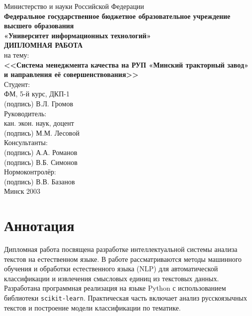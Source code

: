 \documentclass[14pt,a4paper]{extarticle}
\begin{document}
\begin{titlepage}
    \centering
    \large
    Министерство и науки Российской Федерации\\
    \textbf{Федеральное государственное бюджетное образовательное учреждение высшего образования}\\
    \textbf{«Университет информационных технологий»}\\[2cm]

    \textbf{\Large ДИПЛОМНАЯ РАБОТА}\\[0.5cm]
    на тему:\\[0.3cm]
    \textbf{<<Система менеджмента качества на РУП «Минский тракторный завод» и направления её совершенствования>>}\\[4cm]

    Студент:\\
    ФМ, 5-й курс, ДКП-1\\
    (подпись) В.Л. Громов\\[1cm]

    Руководитель:\\
    кан. экон. наук, доцент\\
    (подпись) М.М. Лесовой\\[1cm]

    Консультанты:\\
    (подпись) А.А. Романов\\
    (подпись) В.Б. Симонов\\[1cm]

    Нормоконтролёр:\\
    (подпись) В.В. Базанов\\[3cm]

    Минск 2003
\end{titlepage}

\tableofcontents
\newpage

\section*{Аннотация}
Дипломная работа посвящена разработке интеллектуальной системы анализа текстов на естественном языке.
В работе рассматриваются методы машинного обучения и обработки естественного языка (NLP) для автоматической классификации и извлечения смысловых единиц из текстовых данных.
Разработана программная реализация на языке Python с использованием библиотеки \texttt{scikit-learn}.
Практическая часть включает анализ русскоязычных текстов и построение модели классификации по тематике.
\end{document}
